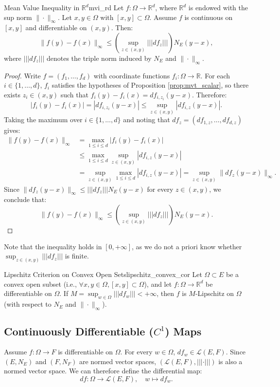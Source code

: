 \documentclass[11pt, a4paper]{article}
\newcommand{\R}{\mathbb{R}}
\begin{document}
\begin{corollary}{Mean Value Inequality in $\R^d$}{mvi_rd}
Let $f: \Omega \to \R^d$, where $\R^d$ is endowed with the sup norm $\|\cdot\|_\infty$. Let $x, y \in \Omega$ with $[x, y] \subset \Omega$. Assume $f$ is continuous on $[x, y]$ and differentiable on $(x, y)$. Then:
\[
\|f(y) - f(x)\|_\infty \le \left(\sup_{z \in (x, y)} |||df_z|||\right) N_E(y - x),
\]
where $|||df_z|||$ denotes the triple norm induced by $N_E$ and $\|\cdot\|_\infty$.
\end{corollary}
\begin{proof}
Write $f = (f_1, \dots, f_d)$ with coordinate functions $f_i: \Omega \to \R$. For each $i \in \{1, \dots, d\}$, $f_i$ satisfies the hypotheses of Proposition \ref{prop:mvt_scalar}, so there exists $z_i \in (x, y)$ such that $f_i(y) - f_i(x) = df_{i, z_i}(y - x)$. Therefore:
\[
|f_i(y) - f_i(x)| = |df_{i, z_i}(y - x)| \le \sup_{z \in (x, y)} |df_{i, z}(y - x)|.
\]
Taking the maximum over $i \in \{1, \dots, d\}$ and noting that $df_z = (df_{1, z}, \dots, df_{d, z})$ gives:
\begin{align*}
\|f(y) - f(x)\|_\infty &= \max_{1 \le i \le d} |f_i(y) - f_i(x)| \\
&\le \max_{1 \le i \le d} \sup_{z \in (x, y)} |df_{i, z}(y - x)| \\
&= \sup_{z \in (x, y)} \max_{1 \le i \le d} |df_{i, z}(y - x)| = \sup_{z \in (x, y)} \|df_z(y - x)\|_\infty.
\end{align*}
Since $\|df_z(y - x)\|_\infty \le |||df_z||| N_E(y - x)$ for every $z \in (x, y)$, we conclude that:
\[
\|f(y) - f(x)\|_\infty \le \left(\sup_{z \in (x, y)} |||df_z|||\right) N_E(y - x).
\]
\end{proof}

\begin{remark}{}{}
Note that the inequality holds in $[0, +\infty]$, as we do not a priori know whether $\sup_{z \in (x, y)} |||df_z|||$ is finite.
\end{remark}

\begin{corollary}{Lipschitz Criterion on Convex Open Sets}{lipschitz_convex_cor}
Let $\Omega \subset E$ be a convex open subset (i.e., $\forall x, y \in \Omega, [x, y] \subset \Omega$), and let $f: \Omega \to \R^d$ be differentiable on $\Omega$. If $M = \sup_{w \in \Omega} |||df_w||| < +\infty$, then $f$ is $M$-Lipschitz on $\Omega$ (with respect to $N_E$ and $\|\cdot\|_\infty$).
\end{corollary}

\subsection{Continuously Differentiable ($C^1$) Maps}
Assume $f: \Omega \to F$ is differentiable on $\Omega$. For every $w \in \Omega$, $df_w \in \mathcal{L}(E, F)$. Since $(E, N_E)$ and $(F, N_F)$ are normed vector spaces, $(\mathcal{L}(E, F), |||\cdot|||)$ is also a normed vector space. We can therefore define the differential map:
\[
df: \Omega \to \mathcal{L}(E, F), \quad w \mapsto df_w.
\]
\end{document}
